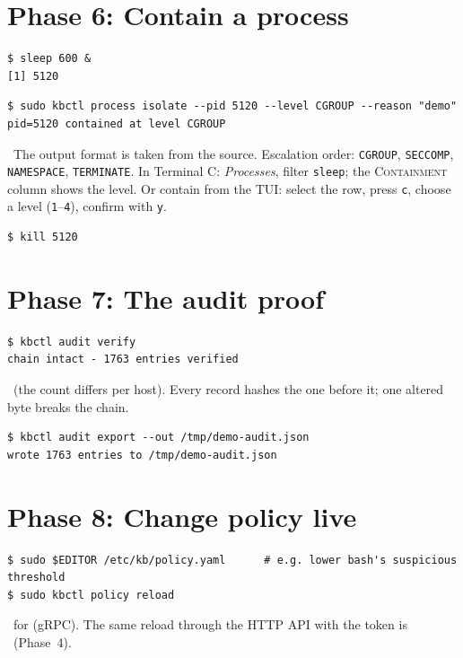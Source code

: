 \section{Phase 6: Contain a process}
\resetsteps
{}
\begin{lstlisting}[style=console]
$ sleep 600 &
[1] 5120
\end{lstlisting}
\begin{lstlisting}[style=console]
$ sudo kbctl process isolate --pid 5120 --level CGROUP --reason "demo"
pid=5120 contained at level CGROUP
\end{lstlisting}
\fromsrc\ The output format is taken from the source. Escalation order: \texttt{CGROUP}, \texttt{SECCOMP}, \texttt{NAMESPACE}, \texttt{TERMINATE}.
In Terminal C: \emph{Processes}, filter \texttt{sleep}; the \textsc{Containment} column shows the level. Or contain from the TUI: select the row,
press \texttt{c}, choose a level (\texttt{1}--\texttt{4}), confirm with \texttt{y}. \notrun
{}
\begin{lstlisting}[style=console]
$ kill 5120
\end{lstlisting}

\section{Phase 7: The audit proof}
\resetsteps
{}
\begin{lstlisting}[style=console]
$ kbctl audit verify
chain intact - 1763 entries verified
\end{lstlisting}
\verified\ (the count differs per host). Every record hashes the one before it; one altered byte breaks the chain.
\begin{lstlisting}[style=console]
$ kbctl audit export --out /tmp/demo-audit.json
wrote 1763 entries to /tmp/demo-audit.json
\end{lstlisting}
\fromsrc

\section{Phase 8: Change policy live}
\resetsteps
{}
\begin{lstlisting}[style=console]
$ sudo $EDITOR /etc/kb/policy.yaml      # e.g. lower bash's suspicious threshold
$ sudo kbctl policy reload
\end{lstlisting}
\notrun\ for  (gRPC). The same reload through the HTTP API with the token is \verified\ (Phase~4).

